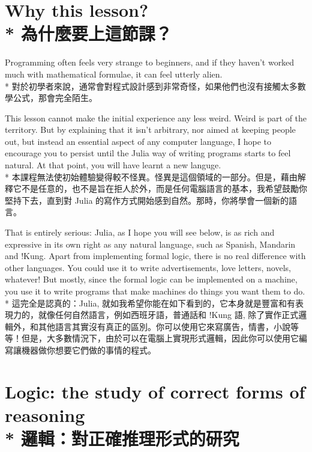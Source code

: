 \documentclass[]{article}
\begin{document}
\section*{{\color{gray}Why this lesson?}
\\*
{為什麼要上這節課？}}

{\color{gray}Programming often feels very strange to beginners, and if they haven't worked much with mathematical formulae, it can feel utterly alien.}
\\*
{對於初學者來說，通常會對程式設計感到非常奇怪，如果他們也沒有接觸太多數學公式，那會完全陌生。}

{\color{gray}This lesson cannot make the initial experience any less weird. Weird is part of the territory. But by explaining that it isn't arbitrary, nor aimed at keeping people out, but instead an essential aspect of any computer language, I hope to encourage you to persist until the Julia way of writing programs starts to feel natural. At that point, you will have learnt a new {\color{cyan}languge}.}
\\*
{本課程無法使初始體驗變得較不怪異。怪異是這個領域的一部分。但是，藉由解釋它不是任意的，也不是旨在拒人於外，而是任何電腦語言的基本，我希望鼓勵你堅持下去，直到對 Julia 的寫作方式開始感到自然。那時，你將學會一個新的語言。}

{\color{gray}That is entirely serious: Julia, as I hope you will see below, is as rich and expressive in its own right as any natural language, such as Spanish, Mandarin and !Kung. Apart from implementing formal logic, there is no real difference with other languages. You could use it to write advertisements, love letters, novels, whatever! But mostly, since the formal logic can be implemented on a machine,  you use it to write programs that make machines do things you want them to do.}
\\*
{這完全是認真的：Julia, 就如我希望你能在如下看到的，它本身就是豐富和有表現力的，就像任何自然語言，例如西班牙語，普通話和{ }!Kung 語, 除了實作正式邏輯外，和其他語言其實沒有真正的區別。你可以使用它來寫廣告，情書，小說等等！但是，大多數情況下，由於可以在電腦上實現形式邏輯，因此你可以使用它編寫讓機器做你想要它們做的事情的程式。}

\section*{{\color{gray}Logic: the study of correct forms of reasoning} 
\\*
{邏輯：對正確推理形式的研究}}		
\end{document}
